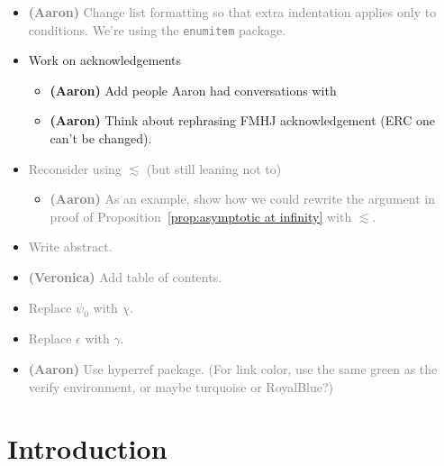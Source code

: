 \documentclass{article}
\theoremstyle{plain}
\newenvironment{brainstorm}{\color{violet}\begin{itemize}}{\end{itemize}\color{black}}
\begin{document}
\begin{brainstorm}
\begin{itemize}
\end{itemize}
\color{violet}
\item \textcolor{gray}{\textbf{(Aaron)} Change list formatting so that extra indentation applies only to conditions. We're using the \texttt{enumitem} package.}
\item Work on acknowledgements
\begin{itemize}
\item \textbf{(Aaron)} Add people Aaron had conversations with
\item \textbf{(Aaron)} Think about rephrasing FMHJ acknowledgement (ERC one can't be changed).
\end{itemize}
\item \textcolor{gray}{Reconsider using $\lesssim$ (but still leaning not to)}
\begin{itemize}
    \item \textcolor{gray}{\textbf{(Aaron)} As an example, show how we could rewrite the argument in proof of Proposition~\ref{prop:asymptotic at infinity} with $\lesssim$.}
\end{itemize}
\item \textcolor{gray}{Write abstract.}
\item \textcolor{gray}{\textbf{(Veronica)} Add table of contents.}
\item \textcolor{gray}{Replace $\psi_0$ with $\chi$.}
\item \textcolor{gray}{Replace $\epsilon$ with $\gamma$.}
\item \textcolor{gray}{\textbf{(Aaron)} Use hyperref package. (For link color, use the same green as the verify environment, or maybe turquoise or RoyalBlue?)}
\end{brainstorm}
\section{Introduction}\label{sec:intro}
\end{document}
